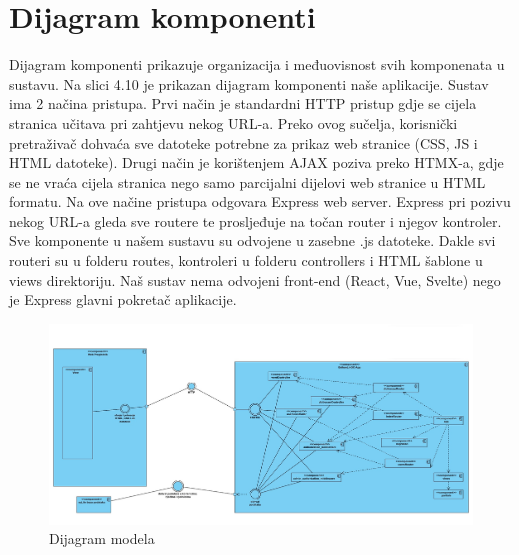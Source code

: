 			\eject
		\section{Dijagram komponenti}
		
        Dijagram komponenti prikazuje organizacija i međuovisnost svih komponenata u sustavu. Na slici 4.10 je prikazan dijagram komponenti naše aplikacije. 
        Sustav ima 2 načina pristupa. Prvi način je standardni HTTP pristup gdje se cijela stranica učitava pri zahtjevu nekog URL-a. Preko ovog sučelja, korisnički pretraživač dohvaća sve datoteke potrebne za prikaz web stranice (CSS, JS i HTML datoteke). Drugi način je korištenjem AJAX poziva preko HTMX-a, gdje se ne vraća cijela stranica nego samo parcijalni dijelovi web stranice u HTML formatu. Na ove načine pristupa odgovara Express web server. Express pri pozivu nekog URL-a gleda sve routere te prosljeđuje na točan router i njegov kontroler. Sve komponente u našem sustavu su odvojene u zasebne .js datoteke. Dakle svi routeri su u folderu routes, kontroleri u folderu controllers i HTML šablone u views direktoriju. Naš sustav nema odvojeni front-end (React, Vue, Svelte) nego je Express glavni pokretač aplikacije.

        \begin{figure}[H]
            \includegraphics[width=1.0\textwidth]{dijagrami/DijagamKomponenti.jpg} 
            \centering
            \caption{Dijagram modela}
            \label{fig:class_diagram}
        \end{figure}	
            
            \eject
			